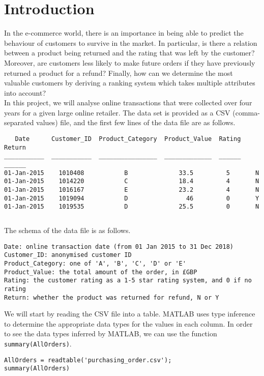 \section*{Introduction}
In the e-commerce world, there is an importance in being able to predict the behaviour of customers to survive in the market. In particular, is there a relation between a product being returned and the rating that was left by the customer? Moreover, are customers less likely to make future orders if they have previously returned a product for a refund? Finally, how can we determine the most valuable customers by deriving a ranking system which takes multiple attributes into account? \\

\noindent
In this project, we will analyse online transactions that were collected over four years for a given large online retailer. The data set is provided as a CSV (comma-separated values) file, and the first few lines of the data file are as follows. \\

\begin{lstlisting}
   Date      Customer_ID  Product_Category  Product_Value  Rating  Return
___________  ___________  ________________  _____________  ______  ______
01-Jan-2015    1010408           B              33.5         5       N 
01-Jan-2015    1014220           C              18.4         4       N 
01-Jan-2015    1016167           E              23.2         4       N 
01-Jan-2015    1019094           D                46         0       Y 
01-Jan-2015    1019535           D              25.5         0       N
\end{lstlisting}
$ $

\noindent
The schema of the data file is as follows.
\begin{lstlisting}[language=none]
Date: online transaction date (from 01 Jan 2015 to 31 Dec 2018)
Customer_ID: anonymised customer ID
Product_Category: one of 'A', 'B', 'C', 'D' or 'E'
Product_Value: the total amount of the order, in £GBP
Rating: the customer rating as a 1-5 star rating system, and 0 if no rating
Return: whether the product was returned for refund, N or Y
\end{lstlisting}

\noindent
We will start by reading the CSV file into a table. MATLAB uses type inference to determine the appropriate data types for the values in each column. In order to see the data types inferred by MATLAB, we can use the function \lstinline|summary(AllOrders)|.
\begin{lstlisting}
AllOrders = readtable('purchasing_order.csv');
summary(AllOrders)
\end{lstlisting}
